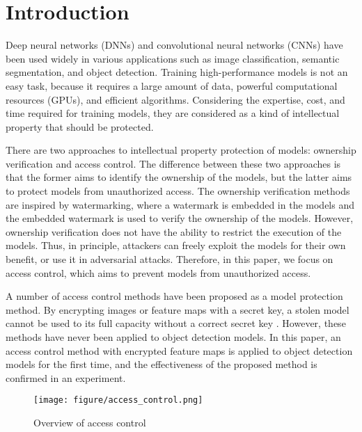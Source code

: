 \documentclass[conference,10pt,a4paper]{IEEEtran}
\begin{document}
\section{Introduction}
Deep neural networks (DNNs) and convolutional neural networks (CNNs) have been used widely in various applications such as image classification, semantic segmentation, and object detection\cite{krizhevsky2017imagenet,liu2019recent, galvez2018object}. Training high-performance models is not an easy task, because it requires a large amount of data, powerful computational resources (GPUs), and efficient algorithms. Considering the expertise, cost, and time required for training models, they are considered as a kind of intellectual property that should be protected. \par
There are two approaches to intellectual property protection of models: ownership verification and access control. The difference between these two approaches is that the former aims to identify the ownership of the models, but the latter aims to protect models from unauthorized access\cite{kiya2022overview}.
The ownership verification methods are inspired by watermarking, where a watermark is embedded in the models and the embedded watermark is used to verify the ownership of the models\cite{uchida2017embedding,zhang2018protecting,darvish2019deepsigns,NEURIPS2019_75455e06,xue2021dnn,maung2021piracy}.
However, ownership verification does not have the ability to restrict the execution of the models. Thus, in principle, attackers can freely exploit the models for their own benefit, or use it in adversarial attacks\cite{szegedy2013intriguing}. Therefore, in this paper, we focus on access control, which aims to prevent models from unauthorized access.\par
A number of access control methods have been proposed as a model protection method. 
By encrypting images or feature maps with a secret key, a stolen model cannot be used to its full capacity without a correct secret key \cite{maungmaung_kiya_2021,maung2021protection,ito2021access}.  However, these  methods  have never been applied to object detection models. In this paper, an access control method with encrypted feature maps is applied to object detection models for the first time, and the effectiveness of the proposed method is confirmed in an experiment. 

\begin{figure}[t]
    \centering
    \texttt{[image: figure/access\_control.png]}
    \caption{Overview of access control}
    \label{access_control}
\end{figure}
\end{document}
